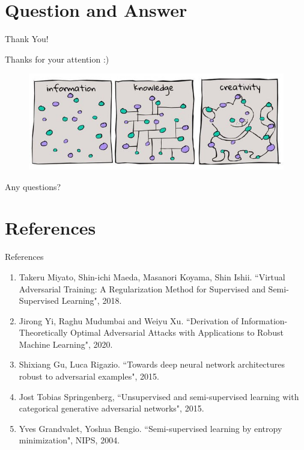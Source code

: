 \section{Question and Answer}
\begin{frame}{Thank You!}

Thanks for your attention :)

\begin{figure}[H]
\centering
\includegraphics[width=0.8\columnwidth]{meme.jpg}
\end{figure}
\vspace{1em}
\begin{center}
Any questions?
\end{center}
\end{frame}

\section{References}
\begin{frame}{References}
\begin{enumerate}
    \item Takeru Miyato, Shin-ichi Maeda, Masanori Koyama, Shin Ishii. ``Virtual Adversarial Training: A Regularization Method for Supervised and Semi-Supervised Learning", 2018.
    \item Jirong Yi, Raghu Mudumbai and Weiyu Xu. ``Derivation of Information-Theoretically Optimal Adversarial Attacks with Applications to Robust Machine Learning", 2020.
    \item Shixiang Gu, Luca Rigazio. ``Towards deep neural network architectures robust to adversarial examples", 2015.
    \item Jost Tobias Springenberg, ``Unsupervised and semi-supervised learning with categorical generative adversarial networks", 2015.
    \item Yves Grandvalet, Yoshua Bengio. ``Semi-supervised learning by entropy minimization", NIPS, 2004.
\end{enumerate}
\end{frame}